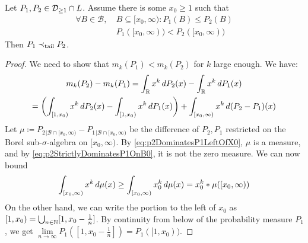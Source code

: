 \documentclass[a4paper]{scrreprt}
\newcommand{\B}{\mathcal{B}}
\begin{document}
    \begin{thm}
        Let $P_1, P_2 \in \mathcal{D}_{\geq1} \cap L$. Assume there is some $x_0 \geq 1$ such that
        \begin{align}
            \forall B \in \B, &~B \subseteq [x_0, \infty): P_1(B) \leq P_2(B)  \label{eq:p2DominatesP1LeftOfX0}  \\
            &~P_1([x_0, \infty)) < P_2([x_0, \infty)) \label{eq:p2StrictlyDominatesP1OnB0}
        \end{align}
        Then $P_1 \prec_{\text{tail}} P_2$.
        \label{thm:tailOrderSufficientConditionsGeneral}
    \end{thm}    
    \begin{proof}
        We need to show that $m_k(P_1) < m_k(P_2)$ for $k$ large enough. We have:
        \begin{multline*}
            m_k(P_2) - m_k(P_1)
            = \int_{\mathbb{R}} x^k \, dP_2(x) - \int_{\mathbb{R}} x^k \, dP_1(x) \\
            = \biggl(\int_{[1, x_0)} x^k \, dP_2(x) - \int_{[1, x_0)} x^k \, dP_1(x)\biggr)
            + \int_{[x_0, \infty)} x^k \, d(P_2 - P_1)(x)
        \end{multline*}
        Let $\mu \coloneqq P_2{}_{\vert \B \cap [x_0, \infty)} - P_1{}_{\vert \B \cap [x_0, \infty)}$ be the difference of $P_2, P_1$ restricted on the Borel sub-$\sigma$-algebra on $[x_0, \infty)$. By \eqref{eq:p2DominatesP1LeftOfX0}, $\mu$ is a measure, and by \eqref{eq:p2StrictlyDominatesP1OnB0}, it is not the zero measure.
        We can now bound
        \begin{gather*}
            \int_{[x_0, \infty)} x^k \, d\mu(x)
            \geq \int_{[x_0, \infty)} x_0^k \, d\mu(x)
            = x_0^k * \mu([x_0, \infty))
        \end{gather*}
        On the other hand, we can write the portion to the left of $x_0$ as $[1, x_0) = \bigcup_{n \in \mathbb{N}} [1, x_0 - \frac{1}{n}]$.
        By continuity from below of the probability measure $P_1$, we get $\lim\limits_{n \to \infty} P_1([1, x_0 - \frac{1}{n}]) = P_1([1, x_0))$.

\end{proof}
\end{document}
